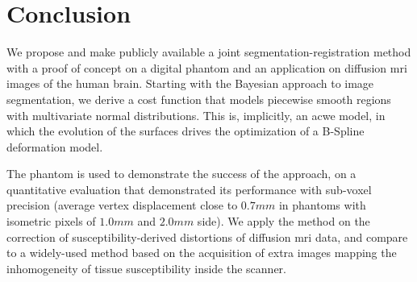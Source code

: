 \section*{Conclusion}
\label{sec:conclusion}
%
We propose and make publicly available a joint
  segmentation-registration method with a proof of concept
  on a digital phantom and an application on diffusion \gls*{mri}
  images of the human brain.
Starting with the Bayesian approach to image segmentation, we derive
  a cost function that models piecewise smooth regions with
  multivariate normal distributions.
This is, implicitly, an \acrlong*{acwe} model, in which the
  evolution of the surfaces drives the optimization of a B-Spline
  deformation model.

The phantom is used to demonstrate the success of the approach,
  on a quantitative evaluation that demonstrated its performance
  with sub-voxel precision (average vertex displacement close to
  $0.7mm$ in phantoms with isometric pixels of $1.0mm$ and $2.0mm$
  side).
We apply the method on the correction of susceptibility-derived
  distortions of diffusion \gls*{mri} data, and compare to
  a widely-used method based on the acquisition of extra images
  mapping the inhomogeneity of tissue susceptibility inside
  the scanner.